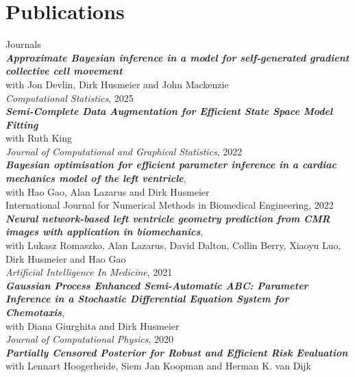 \section{\mysidestyle Publications}
{\mysidestyle Journals\vspace{1mm}}\\
%
\textit{\textbf{Approximate Bayesian inference in a model for self-generated gradient collective cell movement}}\\
	with Jon Devlin, Dirk Husmeier and John Mackenzie\\
    \textit{Computational Statistics}, 2025 \vspace{2mm} \\ 
%
\textit{\textbf{Semi-Complete Data Augmentation for Efficient State Space Model Fitting}}\\ 
    with Ruth King \\
    \textit{Journal of Computational and Graphical Statistics}, 2022 \vspace{2mm} \\   
%
\textit{\textbf{Bayesian optimisation for efficient parameter inference in a cardiac mechanics model of the left ventricle}},\\ 
    with Hao Gao, Alan Lazarus and Dirk Husmeier \\
    International Journal for Numerical Methods in Biomedical Engineering, 2022 \vspace{2 mm}\\
%    
\textit{\textbf{Neural network-based left ventricle geometry prediction from CMR images with application in biomechanics}},\\
	with Lukasz Romaszko, Alan Lazarus, David Dalton, Collin Berry, Xiaoyu Luo, Dirk Husmeier and Hao Gao\\
    \textit{Artificial Intelligence In Medicine}, 2021 \vspace{2 mm}\\
%   
\textit{\textbf{Gaussian Process Enhanced Semi-Automatic ABC: Parameter Inference in a Stochastic Differential Equation System for Chemotaxis}},\\ 
    with Diana Giurghita and Dirk Husmeier\\
    \textit{Journal of Computational Physics}, 2020 \vspace{2 mm}\\
%
\textit{\textbf{Partially Censored Posterior for Robust and Efficient Risk Evaluation}}\\
	with Lennart Hoogerheide, Siem Jan Koopman and Herman K. van Dijk\\
